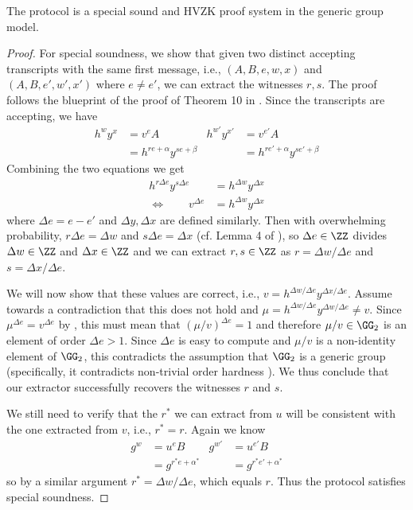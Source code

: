 \begin{theorem}[\zkpoks]\label{thm:poks}
    The protocol \zkpoks is a special sound and HVZK proof system in the generic group model.
\end{theorem}
\begin{proof}
    For special soundness, we show that given two distinct accepting transcripts with the same first message, i.e., $(A, B, e, w, x)$ and $(A, B, e', w', x')$ where $e \neq e'$, we can extract the witnesses $r, s$. The proof follows the blueprint of the proof of Theorem 10 in \cite{C:BonBunFis19}. Since the transcripts are accepting, we have
    \begin{align*}
        h^w y^x &= v^e A               & h^{w'} y^{x'} &= v^{e'} A \\
                &= h^{r e + \alpha} y^{s e + \beta} &  &= h^{r e' + \alpha} y^{s e' + \beta}
    \end{align*}
    Combining the two equations we get 
    \begin{align}
         h^{r \Delta e} y^{s \Delta e} &= h^{\Delta w} y^{\Delta x} \nonumber \\
    \iff \hspace{2em} v^{\Delta e} &= h^{\Delta w} y^{\Delta x} \label{eq:combo}
    \end{align}
    where $\Delta e = e-e'$ and $\Delta y, \Delta x$ are defined similarly. 
    Then with overwhelming probability, $r \Delta e = \Delta w$ and $s \Delta e = \Delta x$ (cf. Lemma 4 of \cite{C:BonBunFis19}), so $\Delta e \in \ZZ$ divides $\Delta w \in \ZZ$ and $\Delta x \in \ZZ$ and we can extract $r,s \in \ZZ$ as $r = \Delta w / \Delta e$ and $s = \Delta x/\Delta e$.
    
    We will now show that these values are correct, i.e., $v = h^{\Delta w/\Delta e} y^{\Delta x/\Delta e}$. Assume towards a contradiction that this does not hold and $\mu = h^{\Delta w/\Delta e} y^{\Delta w/\Delta e}\allowbreak \neq v$. Since $\mu^{\Delta e} = v^{\Delta e}$ by , this must mean that $(\mu/v)^{\Delta e} = 1$ and therefore $\mu/v \in \GG_2$ is an element of order $\Delta e > 1$. Since $\Delta e$ is easy to compute and $\mu/v$ is a non-identity element of $\GG_2$, this contradicts the assumption that $\GG_2$ is a generic group (specifically, it contradicts non-trivial order hardness \cite[Corollary 2]{C:BonBunFis19}). We thus conclude that our extractor successfully recovers the witnesses $r$ and $s$.
    
    We still need to verify that the $r^*$ we can extract from $u$ will be consistent with the one extracted from $v$, i.e., $r^* = r$. Again we know
    \begin{align*}
             g^w &= u^e B            & g^{w'} &= u^{e'} B \\
                 &= g^{r^* e + \alpha^*} &    &= g^{r^* e' + \alpha^*}
    \end{align*}
    so by a similar argument $r^* = \Delta w/\Delta e$, which equals $r$.
    Thus the protocol satisfies special soundness.
    

\end{proof}
